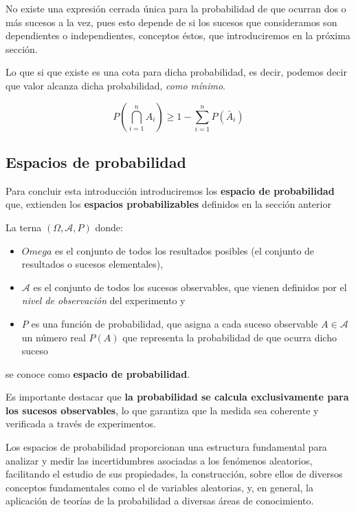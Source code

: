\documentclass[
]{article}
\providecommand{\tightlist}{%
  \setlength{\itemsep}{0pt}\setlength{\parskip}{0pt}}
\begin{document}
No existe una expresión cerrada única para la probabilidad de que ocurran dos o más sucesos a la vez, pues esto depende de si los sucesos que consideramos son dependientes o independientes, conceptos éstos, que introduciremos en la próxima sección.

Lo que si que existe es una cota para dicha probabilidad, es decir, podemos decir que valor alcanza dicha probabilidad, \emph{como mínimo}.

\[
P\left(\bigcap_{i=1}^{n} A_{i}\right) \geq 1-\sum_{i=1}^{n} P\left(\bar{A}_{i}\right)
\]

\subsection{Espacios de probabilidad}\label{espacios-de-probabilidad}

Para concluir esta introducción introduciremos los \textbf{espacio de probabilidad} que, extienden los \textbf{espacios probabilizables} definidos en la sección anterior

La terna \((\Omega, \mathcal{A}, P)\) donde:

\begin{itemize}
\tightlist
\item
  \(Omega\) es el conjunto de todos los resultados posibles (el conjunto de resultados o sucesos elementales),
\item
  \(\mathcal{A}\) es el conjunto de todos los sucesos observables, que vienen definidos por el \emph{nivel de observación} del experimento y
\item
  \(P\) es una función de probabilidad, que asigna a cada suceso observable \(A \in \mathcal{A}\) un número real \(P(A)\) que representa la probabilidad de que ocurra dicho suceso
\end{itemize}

se conoce como \textbf{espacio de probabilidad}.

Es importante destacar que \textbf{la probabilidad se calcula exclusivamente para los sucesos observables}, lo que garantiza que la medida sea coherente y verificada a través de experimentos.

Los espacios de probabilidad proporcionan una estructura fundamental para analizar y medir las incertidumbres asociadas a los fenómenos aleatorios, facilitando el estudio de sus propiedades, la construcción, sobre ellos de diversos conceptos fundamentales como el de variables aleatorias, y, en general, la aplicación de teorías de la probabilidad a diversas áreas de conocimiento.
\end{document}

